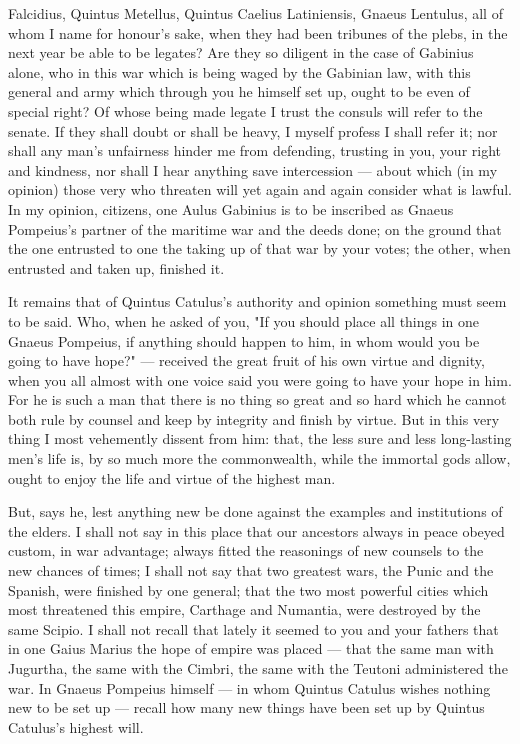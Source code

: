  Falcidius, Quintus Metellus, Quintus Caelius Latiniensis, Gnaeus Lentulus, all of whom I name for honour's sake, when they had been tribunes of the plebs, in the next year be able to be legates? Are they so diligent in the case of Gabinius alone, who in this war which is being waged by the Gabinian law, with this general and army which through you he himself set up, ought to be even of special right? Of whose being made legate I trust the consuls will refer to the senate. If they shall doubt or shall be heavy, I myself profess I shall refer it; nor shall any man's unfairness hinder me from defending, trusting in you, your right and kindness, nor shall I hear anything save intercession --- about which (in my opinion) those very who threaten will yet again and again consider what is lawful. In my opinion, citizens, one Aulus Gabinius is to be inscribed as Gnaeus Pompeius's partner of the maritime war and the deeds done; on the ground that the one entrusted to one the taking up of that war by your votes; the other, when entrusted and taken up, finished it.

 It remains that of Quintus Catulus's authority and opinion something must seem to be said. Who, when he asked of you, "If you should place all things in one Gnaeus Pompeius, if anything should happen to him, in whom would you be going to have hope?" --- received the great fruit of his own virtue and dignity, when you all almost with one voice said you were going to have your hope in him. For he is such a man that there is no thing so great and so hard which he cannot both rule by counsel and keep by integrity and finish by virtue. But in this very thing I most vehemently dissent from him: that, the less sure and less long-lasting men's life is, by so much more the commonwealth, while the immortal gods allow, ought to enjoy the life and virtue of the highest man.

 But, says he, lest anything new be done against the examples and institutions of the elders. I shall not say in this place that our ancestors always in peace obeyed custom, in war advantage; always fitted the reasonings of new counsels to the new chances of times; I shall not say that two greatest wars, the Punic and the Spanish, were finished by one general; that the two most powerful cities which most threatened this empire, Carthage and Numantia, were destroyed by the same Scipio. I shall not recall that lately it seemed to you and your fathers that in one Gaius Marius the hope of empire was placed --- that the same man with Jugurtha, the same with the Cimbri, the same with the Teutoni administered the war. In Gnaeus Pompeius himself --- in whom Quintus Catulus wishes nothing new to be set up --- recall how many new things have been set up by Quintus Catulus's highest will.

